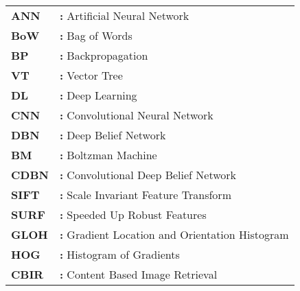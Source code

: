 \hspace{-3mm}
\begin{tabular}{p{2cm}l}
{\bf ANN} & {\bf:} Artificial Neural Network\\
{\bf{BoW}} & {\bf:} Bag of Words\\
{\bf BP} & {\bf:} Backpropagation\\
{\bf VT} & {\bf:} Vector Tree\\
{\bf{DL}} & {\bf:} Deep Learning\\
{\bf{CNN}} & {\bf:} Convolutional Neural Network\\
{\bf{DBN}} & {\bf:} Deep Belief Network\\
{\bf{BM}} & {\bf:} Boltzman Machine\\
{\bf{CDBN}} & {\bf:} Convolutional Deep Belief Network\\
{\bf{SIFT}} & {\bf:} Scale Invariant Feature Transform\\
{\bf{SURF}} & {\bf:} Speeded Up Robust Features\\
{\bf{GLOH}} & {\bf:} Gradient Location and Orientation Histogram\\
{\bf{HOG}} & {\bf:} Histogram of Gradients\\
{\bf{CBIR}} & {\bf:} Content Based Image Retrieval\\
\end{tabular}

